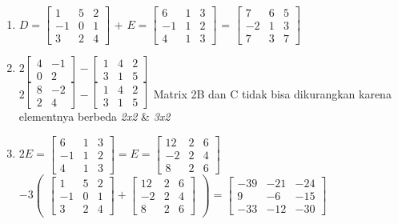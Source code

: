 \documentclass[12pt, a4paper, onecolumn, oneside, final, bahasa]{report}
\begin{document}
\begin{enumerate}
\def\labelenumi{\arabic{enumi}.}
\item
  \(D=\begin{bmatrix} 1 & 5 & 2 \\ -1 & 0 & 1 \\ 3 & 2 & 4 \end{bmatrix}\)
  +
  \(E=\begin{bmatrix} 6 & 1 & 3 \\ -1 & 1 & 2 \\ 4 & 1 & 3 \end{bmatrix}\)
  =
  \(\begin{bmatrix} 7 & 6 & 5 \\ -2 & 1 & 3 \\ 7 & 3 & 7 \end{bmatrix}\)
\item
  \(2\begin{bmatrix} 4 & -1 \\ 0 & 2 \end{bmatrix} -\begin{bmatrix} 1 & 4 & 2 \\ 3 & 1 & 5 \end{bmatrix}\)\\
  \(2\begin{bmatrix} 8 & -2 \\ 2 & 4 \end{bmatrix} -\begin{bmatrix} 1 & 4 & 2 \\ 3 & 1 & 5 \end{bmatrix}\)
  Matrix 2B dan C tidak bisa dikurangkan karena elementnya berbeda
  \emph{2x2} \& \emph{3x2}
\item
  \(2E=\begin{bmatrix} 6 & 1 & 3 \\ -1 & 1 & 2 \\ 4 & 1 & 3 \end{bmatrix} = E=\begin{bmatrix} 12 & 2 & 6 \\ -2 & 2 & 4 \\ 8 & 2 & 6 \end{bmatrix}\)\\
  \(-3\begin{pmatrix} \begin{bmatrix} 1 & 5 & 2 \\ -1 & 0 & 1 \\ 3 & 2 & 4 \end{bmatrix} +\begin{bmatrix} 12 & 2 & 6 \\ -2 & 2 & 4 \\ 8 & 2 & 6 \end{bmatrix} \end{pmatrix} =\begin{bmatrix} -39 & -21 & -24 \\ 9 & -6 & -15 \\ -33 & -12 & -30 \end{bmatrix}\)

\end{enumerate}
\end{document}
